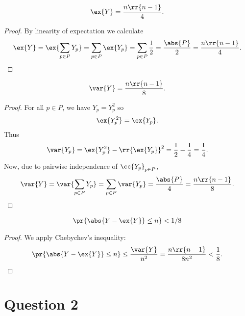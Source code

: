 \documentclass{article}
\begin{document}
\begin{claim*}[e]
  \begin{align*}
    \ex{Y}=\frac{n\rr{n-1}}{4}.
  \end{align*}
  \begin{proof}
    By linearity of expectation we calculate
    \begin{align*}
      \ex{Y}=\ex{\sum_{p\in P} Y_p}=\sum_{p\in P} \ex{Y_p} = \sum_{p\in P} \frac{1}{2} = \frac{\abs{P}}{2} = \frac{n\rr{n-1}}{4}.
    \end{align*}
  \end{proof}
\end{claim*}

\begin{claim*}[f]
  \begin{align*}
    \var{Y}=\frac{n\rr{n-1}}{8}.
  \end{align*}
  \begin{proof}
    For all $p\in P$, we have $Y_p=Y_p^2$ so
    \begin{align*}
      \ex{Y_p^2} = \ex{Y_p}.
    \end{align*}
    Thus
    \begin{align*}
      \var{Y_p}=\ex{Y_p^2}-\rr{\ex{Y_p}}^2 = \frac{1}{2}-\frac{1}{4} = \frac{1}{4}.
    \end{align*}
    Now, due to pairwise independence of $\cc{Y_p}_{p\in P}$,
    \begin{align*}
      \var{Y}=\var{\sum_{p\in P} Y_p} = \sum_{p\in P} \var{Y_p} = \frac{\abs{P}}{4} = \frac{n\rr{n-1}}{8}.
    \end{align*}
  \end{proof}
\end{claim*}

\begin{claim*}[g]
  \begin{align*}
    \pr{\abs{Y-\ex{Y}}\leq n} < 1/8
  \end{align*}
  \begin{proof}
    We apply Chebychev's inequality:
    \begin{align*}
      \pr{\abs{Y-\ex{Y}}\leq n} \leq \frac{\var{Y}}{n^2} = \frac{n\rr{n-1}}{8n^2} < \frac{1}{8}.
    \end{align*}
  \end{proof}
\end{claim*}

\section*{Question 2}
\end{document}
